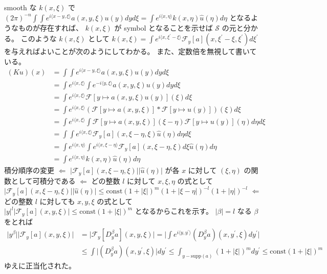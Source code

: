\begin{Proof}
\itemprof
  smooth な \(k(x,\xi)\) で \((2\pi)^{-n} \int \int e^{i \langle x-y , \xi \rangle} a(x,y,\xi) u(y) dy d\xi = \int e^{i \langle x , \eta \rangle} k(x,\eta) \hat{u}(\eta) d\eta\) となるようなものが存在すれば、 \(k(x,\xi)\) が symbol となることを示せば \(\mathscr{S}\) の元と分かる。
  このような \(k(x,\xi)\) として \(k(x,\xi) = \int e^{i \langle x , \xi^\prime - \xi \rangle} \mathscr{F}_y[a] (x , \xi^\prime - \xi , \xi^\prime) d\xi^\prime\) を与えればよいことが次のようにしてわかる。
  また、定数倍を無視して書いている。
  \begin{align*}
    (Ku)(x)
    &= \int \int e^{i \langle x-y , \xi \rangle} a(x,y,\xi) u(y) dy d\xi \\
    &= \int e^{i \langle x , \xi \rangle} \int e^{- i \langle y , \xi \rangle} a(x,y,\xi) u(y) dy d\xi \\
    &= \int e^{i \langle x , \xi \rangle} \mathscr{F}[y \mapsto a(x,y,\xi) u(y)](\xi) d\xi \\
    &= \int e^{i \langle x , \xi \rangle} \left(\mathscr{F}[y \mapsto a(x,y,\xi)] * \mathscr{F}[y \mapsto u(y)]\right) (\xi) d\xi \\
    &= \int e^{i \langle x , \xi \rangle} \int \mathscr{F}[y \mapsto a(x,y,\xi)] (\xi - \eta)\mathscr{F}[y \mapsto u(y)](\eta) d\eta d\xi \\
    &= \int \int e^{i \langle x , \xi \rangle} \mathscr{F}_y[a](x , \xi - \eta , \xi) \hat{u}(\eta) d\eta d\xi \\
    &= \int e^{i \langle x , \eta \rangle} \int e^{i \langle x , \xi - \eta \rangle} \mathscr{F}_y[a](x , \xi - \eta , \xi) d\xi \hat{u}(\eta) d\eta \\
    &= \int e^{i \langle x , \eta \rangle} k(x,\eta) \hat{u}(\eta) d\eta
  \end{align*}
  積分順序の変更
  \(\Leftarrow\) \(\lvert \mathscr{F}_y[a](x,\xi - \eta , \xi) \rvert \lvert \hat{u}(\eta) \rvert\) が各 \(x\) に対して \((\xi , \eta)\)  の関数として可積分である
  \(\Leftarrow\) どの整数 \(l\) に対して \(x , \xi , \eta\) の式として \(\lvert \mathscr{F}_y[a](x , \xi - \eta , \xi) \rvert \lvert \hat{u}(\eta) \rvert \leq \text{const} (1 + \lvert \xi \rvert)^m (1 + \lvert \xi - \eta \rvert)^{-l} (1 + \lvert \eta \rvert)^{-l}\)
  \(\Leftarrow\) どの整数 \(l\) に対しても \(x,y,\xi\) の式として \(\lvert y \rvert^l \lvert \mathscr{F}_y[a](x,y,\xi) \rvert \leq \text{const} (1 + \lvert \xi \rvert)^m\) となるからこれを示す。
  \(\lvert \beta \rvert = l\) なる \(\beta\) をとれば
  \begin{align*}
    \lvert y^\beta \rvert \lvert \mathscr{F}_y[a] (x,y,\xi) \rvert
    &= \lvert \mathscr{F}_y[D^\beta_y a](x , y , \xi) \rvert
      = \lvert \int e^{i \langle y , y^\prime \rangle} (D^\beta_y a)(x , y^\prime , \xi) dy^\prime \rvert \\
    &\leq \int \lvert (D^\beta_y a)(x , y^\prime , \xi) \rvert dy^\prime
      \leq \int_{y-\text{supp}(a)} (1 + \lvert \xi \rvert)^m dy^\prime
      \leq \text{const} (1 + \lvert \xi \rvert)^m
  \end{align*}
  ゆえに正当化された。
\end{Proof}


